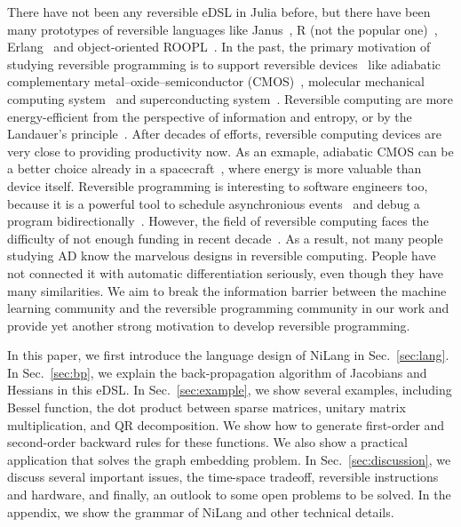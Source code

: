 \documentclass{article}
\newcommand{\<}{\langle}
\renewcommand{\>}{\rangle}
\newcommand{\Sec}[1]{Sec.~\ref{#1}}
\theoremstyle{definition}\newtheorem{definition}{\textit{Definition}}
\begin{document}
There have not been any reversible eDSL in Julia before, but there have been many prototypes of reversible languages like Janus~\cite{Lutz1986}, R (not the popular one)~\cite{Frank1997}, Erlang~\cite{Lanese2018} and object-oriented ROOPL~\cite{Haulund2017}. %
    In the past, the primary motivation of studying reversible programming is to support reversible devices~\cite{Frank1999} like adiabatic complementary metal–oxide–semiconductor (CMOS)~\cite{Koller1992}, molecular mechanical computing system~\cite{Merkle2018} and superconducting system~\cite{Likharev1977,Semenov2003}.
    Reversible computing are more energy-efficient from the perspective of information and entropy, or by the Landauer's principle~\cite{Landauer1961}.
    After decades of efforts, reversible computing devices are very close to providing productivity now. As an exmaple, adiabatic CMOS can be a better choice already in a spacecraft~\cite{Hanninen2014, Debenedictis2017}, where energy is more valuable than device itself.
    Reversible programming is interesting to software engineers too, because it is a powerful tool to schedule asynchronious events~\cite{Jefferson1985} and debug a program bidirectionally~\cite{Boothe2000}.
    However, the field of reversible computing faces the difficulty of not enough funding in recent decade~\cite{Frank2017}. As a result, not many people studying AD know the marvelous designs in reversible computing. People have not connected it with automatic differentiation seriously, even though they have many similarities. We aim to break the information barrier between the machine learning community and the reversible programming community in our work and provide yet another strong motivation to develop reversible programming.

    In this paper, we first introduce the language design of NiLang in \Sec{sec:lang}.
    In \Sec{sec:bp}, we explain the back-propagation algorithm of Jacobians and Hessians in this eDSL.
    In \Sec{sec:example}, we show several examples, including Bessel function, the dot product between sparse matrices, unitary matrix multiplication, and QR decomposition. We show how to generate first-order and second-order backward rules for these functions. We also show a practical application that solves the graph embedding problem.
    In \Sec{sec:discussion}, we discuss several important issues, the time-space  tradeoff, reversible instructions and hardware, and finally, an outlook to some open problems to be solved.
    In the appendix, we show the grammar of NiLang and other technical details.
\end{document}
